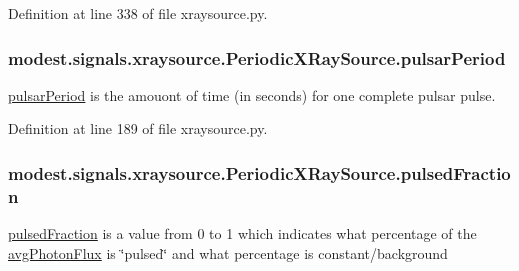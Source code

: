 Definition at line 338 of file xraysource.\+py.

\subsubsection[{\texorpdfstring{pulsar\+Period}{pulsarPeriod}}]{\setlength{\rightskip}{0pt plus 5cm}modest.\+signals.\+xraysource.\+Periodic\+X\+Ray\+Source.\+pulsar\+Period}\hypertarget{classmodest_1_1signals_1_1xraysource_1_1PeriodicXRaySource_aeb6d4a8057d3ee58c81e69fb97b9eef7}{}\label{classmodest_1_1signals_1_1xraysource_1_1PeriodicXRaySource_aeb6d4a8057d3ee58c81e69fb97b9eef7}


\hyperlink{classmodest_1_1signals_1_1xraysource_1_1PeriodicXRaySource_aeb6d4a8057d3ee58c81e69fb97b9eef7}{pulsar\+Period} is the amouont of time (in seconds) for one complete pulsar pulse. 



Definition at line 189 of file xraysource.\+py.

\subsubsection[{\texorpdfstring{pulsed\+Fraction}{pulsedFraction}}]{\setlength{\rightskip}{0pt plus 5cm}modest.\+signals.\+xraysource.\+Periodic\+X\+Ray\+Source.\+pulsed\+Fraction}\hypertarget{classmodest_1_1signals_1_1xraysource_1_1PeriodicXRaySource_a5f968d9c80e5315d1657eac2ffca4e73}{}\label{classmodest_1_1signals_1_1xraysource_1_1PeriodicXRaySource_a5f968d9c80e5315d1657eac2ffca4e73}


\hyperlink{classmodest_1_1signals_1_1xraysource_1_1PeriodicXRaySource_a5f968d9c80e5315d1657eac2ffca4e73}{pulsed\+Fraction} is a value from 0 to 1 which indicates what percentage of the \hyperlink{classmodest_1_1signals_1_1xraysource_1_1PeriodicXRaySource_ac227ebef6424695360f2771765b4a4a7}{avg\+Photon\+Flux} is \char`\"{}pulsed\char`\"{} and what percentage is constant/background 



